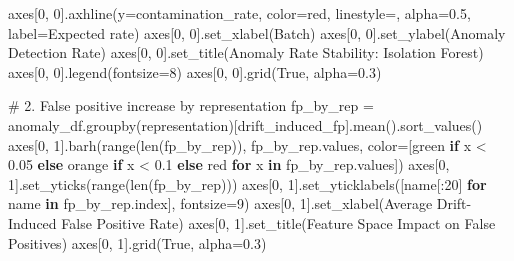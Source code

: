 \documentclass[
  letterpaper,
  DIV=11,
  numbers=noendperiod]{scrartcl}
\newenvironment{Shaded}{\begin{snugshade}}{\end{snugshade}}
\newcommand{\BuiltInTok}[1]{\textcolor[rgb]{0.00,0.23,0.31}{#1}}
\newcommand{\CommentTok}[1]{\textcolor[rgb]{0.37,0.37,0.37}{#1}}
\newcommand{\ControlFlowTok}[1]{\textcolor[rgb]{0.00,0.23,0.31}{\textbf{#1}}}
\newcommand{\DecValTok}[1]{\textcolor[rgb]{0.68,0.00,0.00}{#1}}
\newcommand{\FloatTok}[1]{\textcolor[rgb]{0.68,0.00,0.00}{#1}}
\newcommand{\KeywordTok}[1]{\textcolor[rgb]{0.00,0.23,0.31}{\textbf{#1}}}
\newcommand{\NormalTok}[1]{\textcolor[rgb]{0.00,0.23,0.31}{#1}}
\newcommand{\OperatorTok}[1]{\textcolor[rgb]{0.37,0.37,0.37}{#1}}
\newcommand{\StringTok}[1]{\textcolor[rgb]{0.13,0.47,0.30}{#1}}
\newcommand{\VariableTok}[1]{\textcolor[rgb]{0.07,0.07,0.07}{#1}}
\renewenvironment{Shaded}{%
  \begin{tcolorbox}[%
    enhanced,%
    colback=codebg,%
    colframe=codebg,%
    borderline west={3pt}{0pt}{sectionblue},%
    fontupper=\small\ttfamily,%
    boxrule=0pt,%
    arc=0pt,%
    boxsep=5pt,%
    left=2mm,%
    right=2mm,%
    top=2mm,%
    bottom=2mm%
  ]%
}{%
  \end{tcolorbox}%
}
\begin{document}
\begin{Shaded}
\begin{Highlighting}[]
\NormalTok{axes[}\DecValTok{0}\NormalTok{, }\DecValTok{0}\NormalTok{].axhline(y}\OperatorTok{=}\NormalTok{contamination\_rate, color}\OperatorTok{=}\StringTok{\textquotesingle{}red\textquotesingle{}}\NormalTok{, linestyle}\OperatorTok{=}\StringTok{\textquotesingle{}{-}{-}\textquotesingle{}}\NormalTok{, }
\NormalTok{                   alpha}\OperatorTok{=}\FloatTok{0.5}\NormalTok{, label}\OperatorTok{=}\StringTok{\textquotesingle{}Expected rate\textquotesingle{}}\NormalTok{)}
\NormalTok{axes[}\DecValTok{0}\NormalTok{, }\DecValTok{0}\NormalTok{].set\_xlabel(}\StringTok{\textquotesingle{}Batch\textquotesingle{}}\NormalTok{)}
\NormalTok{axes[}\DecValTok{0}\NormalTok{, }\DecValTok{0}\NormalTok{].set\_ylabel(}\StringTok{\textquotesingle{}Anomaly Detection Rate\textquotesingle{}}\NormalTok{)}
\NormalTok{axes[}\DecValTok{0}\NormalTok{, }\DecValTok{0}\NormalTok{].set\_title(}\StringTok{\textquotesingle{}Anomaly Rate Stability: Isolation Forest\textquotesingle{}}\NormalTok{)}
\NormalTok{axes[}\DecValTok{0}\NormalTok{, }\DecValTok{0}\NormalTok{].legend(fontsize}\OperatorTok{=}\DecValTok{8}\NormalTok{)}
\NormalTok{axes[}\DecValTok{0}\NormalTok{, }\DecValTok{0}\NormalTok{].grid(}\VariableTok{True}\NormalTok{, alpha}\OperatorTok{=}\FloatTok{0.3}\NormalTok{)}

\CommentTok{\# 2. False positive increase by representation}
\NormalTok{fp\_by\_rep }\OperatorTok{=}\NormalTok{ anomaly\_df.groupby(}\StringTok{\textquotesingle{}representation\textquotesingle{}}\NormalTok{)[}\StringTok{\textquotesingle{}drift\_induced\_fp\textquotesingle{}}\NormalTok{].mean().sort\_values()}
\NormalTok{axes[}\DecValTok{0}\NormalTok{, }\DecValTok{1}\NormalTok{].barh(}\BuiltInTok{range}\NormalTok{(}\BuiltInTok{len}\NormalTok{(fp\_by\_rep)), fp\_by\_rep.values, }
\NormalTok{               color}\OperatorTok{=}\NormalTok{[}\StringTok{\textquotesingle{}green\textquotesingle{}} \ControlFlowTok{if}\NormalTok{ x }\OperatorTok{\textless{}} \FloatTok{0.05} \ControlFlowTok{else} \StringTok{\textquotesingle{}orange\textquotesingle{}} \ControlFlowTok{if}\NormalTok{ x }\OperatorTok{\textless{}} \FloatTok{0.1} \ControlFlowTok{else} \StringTok{\textquotesingle{}red\textquotesingle{}} 
                      \ControlFlowTok{for}\NormalTok{ x }\KeywordTok{in}\NormalTok{ fp\_by\_rep.values])}
\NormalTok{axes[}\DecValTok{0}\NormalTok{, }\DecValTok{1}\NormalTok{].set\_yticks(}\BuiltInTok{range}\NormalTok{(}\BuiltInTok{len}\NormalTok{(fp\_by\_rep)))}
\NormalTok{axes[}\DecValTok{0}\NormalTok{, }\DecValTok{1}\NormalTok{].set\_yticklabels([name[:}\DecValTok{20}\NormalTok{] }\ControlFlowTok{for}\NormalTok{ name }\KeywordTok{in}\NormalTok{ fp\_by\_rep.index], fontsize}\OperatorTok{=}\DecValTok{9}\NormalTok{)}
\NormalTok{axes[}\DecValTok{0}\NormalTok{, }\DecValTok{1}\NormalTok{].set\_xlabel(}\StringTok{\textquotesingle{}Average Drift{-}Induced False Positive Rate\textquotesingle{}}\NormalTok{)}
\NormalTok{axes[}\DecValTok{0}\NormalTok{, }\DecValTok{1}\NormalTok{].set\_title(}\StringTok{\textquotesingle{}Feature Space Impact on False Positives\textquotesingle{}}\NormalTok{)}
\NormalTok{axes[}\DecValTok{0}\NormalTok{, }\DecValTok{1}\NormalTok{].grid(}\VariableTok{True}\NormalTok{, alpha}\OperatorTok{=}\FloatTok{0.3}\NormalTok{)}


\end{Highlighting}
\end{Shaded}
\end{document}
